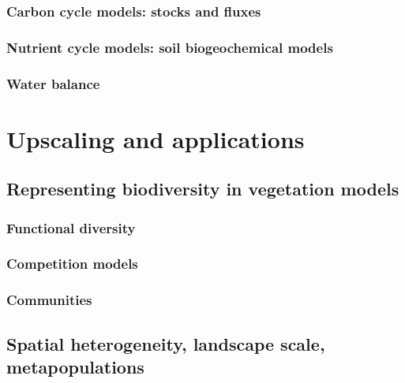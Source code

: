 \documentclass[]{book}
\begin{document}

\section{Carbon cycle models: stocks and
fluxes}\label{carbon-cycle-models-stocks-and-fluxes}

\section{Nutrient cycle models: soil biogeochemical
models}\label{nutrient-cycle-models-soil-biogeochemical-models}

\section{Water balance}\label{water-balance}

\part{Upscaling and
applications}\label{part-upscaling-and-applications}

\chapter{Representing biodiversity in vegetation
models}\label{representing-biodiversity-in-vegetation-models}


\section{Functional diversity}\label{functional-diversity}

\section{Competition models}\label{competition-models}

\section{Communities}\label{communities}

\chapter{Spatial heterogeneity, landscape scale,
metapopulations}\label{spatial-heterogeneity-landscape-scale-metapopulations}
\end{document}
